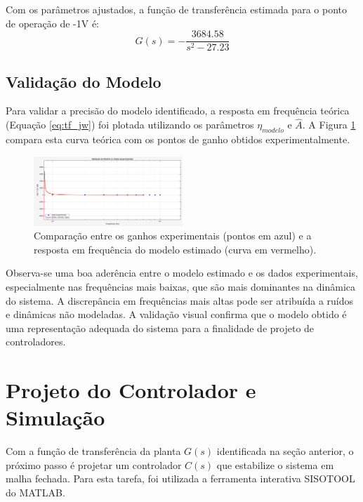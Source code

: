 Com os parâmetros ajustados, a função de transferência estimada para o ponto de operação de -1V é:
\begin{equation}
    G(s) = -\frac{3684.58}{s^2 - 27.23}
    \label{eq:tf_final}
\end{equation}

\subsection{Validação do Modelo}

Para validar a precisão do modelo identificado, a resposta em frequência teórica (Equação \ref{eq:tf_jw}) foi plotada utilizando os parâmetros $\eta_{modelo}$ e $\hat{A}$. A Figura \ref{fig:validacao} compara esta curva teórica com os pontos de ganho obtidos experimentalmente.

\begin{figure}[ht!]
    \centering
    \includegraphics[width=0.5\textwidth]{modelovsreal.png} %
    \caption{Comparação entre os ganhos experimentais (pontos em azul) e a resposta em frequência do modelo estimado (curva em vermelho).}
    \label{fig:validacao}
\end{figure}

Observa-se uma boa aderência entre o modelo estimado e os dados experimentais, especialmente nas frequências mais baixas, que são mais dominantes na dinâmica do sistema. A discrepância em frequências mais altas pode ser atribuída a ruídos e dinâmicas não modeladas. A validação visual confirma que o modelo obtido é uma representação adequada do sistema para a finalidade de projeto de controladores.

\section{Projeto do Controlador e Simulação}

Com a função de transferência da planta $G(s)$ identificada na seção anterior, o próximo passo é projetar um controlador $C(s)$ que estabilize o sistema em malha fechada. Para esta tarefa, foi utilizada a ferramenta interativa SISOTOOL do MATLAB.

